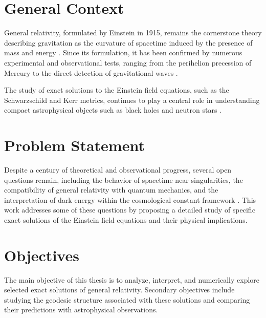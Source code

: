 \label{ch:intro}

\section{General Context}

General relativity, formulated by Einstein in 1915, remains the cornerstone theory describing gravitation as the curvature of spacetime induced by the presence of mass and energy \cite{einstein1916}. Since its formulation, it has been confirmed by numerous experimental and observational tests, ranging from the perihelion precession of Mercury to the direct detection of gravitational waves \cite{ligo2016}.

The study of exact solutions to the Einstein field equations, such as the Schwarzschild and Kerr metrics, continues to play a central role in understanding compact astrophysical objects such as black holes and neutron stars \cite{misner1973}.

\section*{Problem Statement}

Despite a century of theoretical and observational progress, several open questions remain, including the behavior of spacetime near singularities, the compatibility of general relativity with quantum mechanics, and the interpretation of dark energy within the cosmological constant framework \cite{wald1984}. This work addresses some of these questions by proposing a detailed study of specific exact solutions of the Einstein field equations and their physical implications.

\section*{Objectives}

The main objective of this thesis is to analyze, interpret, and numerically explore selected exact solutions of general relativity. Secondary objectives include studying the geodesic structure associated with these solutions and comparing their predictions with astrophysical observations.

\begin{center}
\end{center}

